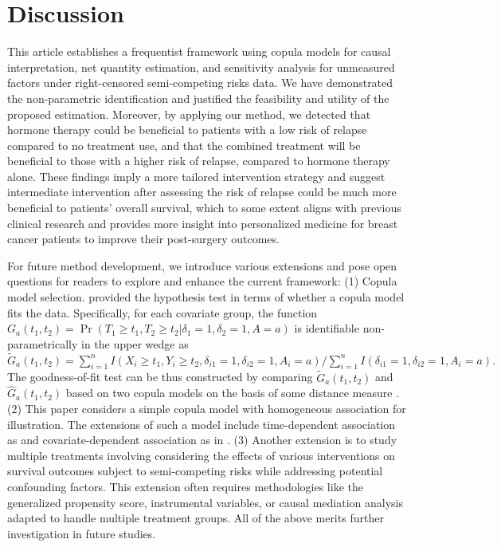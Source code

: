 \documentclass[useAMS,usenatbib,referee]{biom}
\theoremstyle{plain}
\def\Pr{\operatorname{Pr}}
\begin{document}
\section{Discussion}
\label{sec:conclusion}



This article establishes a frequentist framework using copula models for causal interpretation, net quantity estimation, and sensitivity analysis for unmeasured factors under right-censored semi-competing risks data. We have demonstrated the non-parametric identification and justified the feasibility and utility of the proposed estimation. Moreover, by applying our method, we detected that hormone therapy could be beneficial to patients with a low risk of relapse compared to no treatment use, and that the combined treatment will be beneficial to those with a higher risk of relapse, compared to hormone therapy alone. These findings imply a more tailored intervention strategy and suggest intermediate intervention after assessing the risk of relapse could be much more beneficial to patients' overall survival, which to some extent aligns with previous clinical research \citep{sledge2014} and provides more insight into personalized medicine for breast cancer patients to improve their post-surgery outcomes. %




For future method development, we introduce various extensions and pose open questions for readers to explore and enhance the current framework:  (1) Copula model selection. \cite{hsieh2008} provided the hypothesis test in terms of whether a copula model fits the data. Specifically, for each covariate group, the function $G_a(t_1,t_2) = \Pr(T_1\geq t_1, T_2\geq t_2|\delta_1 = 1,\delta_2 = 1, A=a)$ is identifiable non-parametrically in the upper wedge as
$\widetilde{G}_a (t_1,t_2)= \sum\limits_{i=1}^n I(X_i\geq t_1, Y_i\geq t_2,\delta_{i1}=1,\delta_{i2}=1,A_i=a)/\sum\limits_{i=1}^n I(\delta_{i1}=1,\delta_{i2}=1,A_i=a).$
% 
The goodness-of-fit test can be thus constructed by comparing $\widetilde{G}_a(t_1,t_2)$ and $\widehat{G}_a(t_1,t_2)$ based on two copula models on the basis of some distance measure \citep{hsieh2008}. (2) This paper considers a simple copula model with homogeneous association for illustration.  The extensions of such a model include time-dependent association as \cite{peng2007semicompeting} and covariate-dependent association as in \cite{li2015}. (3) Another extension is to study multiple treatments
involving considering the effects of various interventions on survival outcomes subject to semi-competing risks while addressing potential confounding factors. This extension often requires methodologies like the generalized propensity score, instrumental variables, or causal mediation analysis adapted to handle multiple treatment groups. 
All of the above merits further investigation in future studies.
\end{document}
